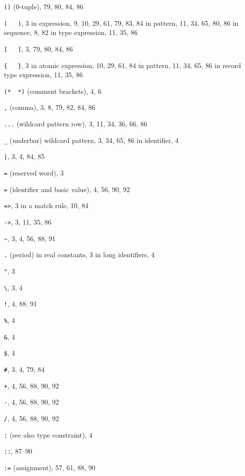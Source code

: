 \label{index-sec}
\begin{theindex}
\item \verb+()+ (0-tuple), 79, 80, 84, 86
\item \verb+(   )+, 3
\subitem in expression, 9, 10, 29, 61, 79, 83, 84
\subitem in pattern, 11, 34, 65, 80, 86
\subitem in sequence, 8, 82
\subitem in type expression, 11, 35, 86
\item \verb+[   ]+, 3, 79, 80, 84, 86
\item \verb+{   }+, 3
\subitem in atomic expression, 10, 29, 61, 84
\subitem in pattern, 11, 34, 65, 86
\subitem in record type expression, 11, 35, 86
\item \verb+(*  *)+ (comment brackets), 4, 6
\item \verb+,+ (comma), 3, 8, 79, 82, 84, 86
\item \verb+...+ (wildcard pattern row), 3, 11, 34, 36, 66, 86
\item \verb+_+ (underbar) 
\subitem wildcard pattern, 3, 34, 65, 86
\subitem in identifier, 4
\item \verb+|+, 3, 4, 84, 85
\item \verb+=+ (reserved word), 3
\item \verb+=+ (identifier and basic value), 4, 56, 90, 92
\item \verb+=>+, 3
\subitem in a match rule, 10, 84
\item \verb+->+, 3, 11, 35, 86
\item \verb+~+, 3, 4, 56, 88, 91
\item \verb+.+ (period) 
\subitem in real constants, 3
\subitem in long identifiers, 4
\item \verb+"+, 3
\item \verb+\+, 3, 4
\item \verb+!+, 4, 88, 91
\item \verb+%+, 4
\item \verb+&+, 4
\item \verb+$+, 4
\item \verb+#+, 3, 4, 79, 84
\item \verb(+(, 4, 56, 88, 90, 92
\item \verb+-+, 4, 56, 88, 90, 92
\item \verb+/+, 4, 56, 88, 90, 92
\item \verb+:+ (see also type constraint), 4
\item \verb+::+, 87--90
\item \verb+:=+ (assignment), 57, 61, 88, 90

\end{theindex}
